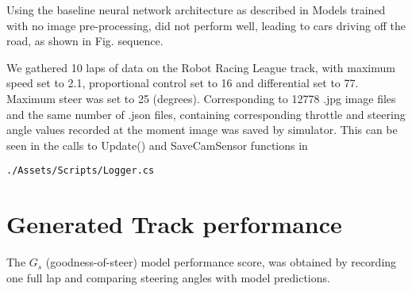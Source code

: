 Using the baseline neural network architecture as described in 
Models trained with no image pre-processing, did not perform well, leading to cars driving off the road, as shown in Fig.  sequence.

We gathered 10 laps of data on the Robot Racing League track, with maximum speed set to 2.1, proportional control set to 16 and differential set to 77. Maximum steer was set to 25 (degrees). Corresponding to 12778 .jpg image files and the same number of  .json files, containing corresponding throttle and steering angle values recorded at the moment image was saved by simulator. This can be seen in the calls to Update() and SaveCamSensor functions in  
\begin{verbatim}
./Assets/Scripts/Logger.cs
\end{verbatim}

\section{Generated Track performance}


The $G_s$ (goodness-of-steer) model performance score, was obtained by recording one full lap and comparing steering angles with model predictions.

